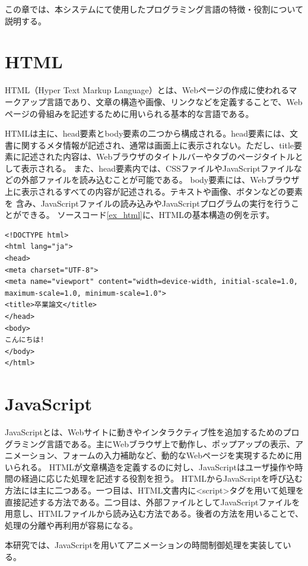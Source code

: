 この章では、本システムにて使用したプログラミング言語の特徴・役割について説明する。
\section{HTML}
HTML（Hyper Text Markup Language）\cite{htmlHeadBody}とは、Webページの作成に使われるマークアップ言語であり、文章の構造や画像、リンクなどを定義することで、Webページの骨組みを記述するために用いられる基本的な言語である。
\par
HTMLは主に、head要素とbody要素の二つから構成される。head要素には、文書に関するメタ情報が記述され、通常は画面上に表示されない。ただし、title要素に記述された内容は、Webブラウザのタイトルバーやタブのページタイトルとして表示される。
また、head要素内では、CSSファイルやJavaScriptファイルなどの外部ファイルを読み込むことが可能である。
body要素には、Webブラウザ上に表示されるすべての内容が記述される。テキストや画像、ボタンなどの要素を
含み、JavaScriptファイルの読み込みやJavaScriptプログラムの実行を行うことができる。
ソースコード\ref{ex_html}に、HTMLの基本構造の例を示す。
\begin{lstlisting}[caption={HTMLコードの例},label={ex_html},breaklines=true,breakatwhitespace=false]
<!DOCTYPE html>
<html lang="ja">
<head>
<meta charset="UTF-8">
<meta name="viewport" content="width=device-width, initial-scale=1.0, maximum-scale=1.0, minimum-scale=1.0">
<title>卒業論文</title>
</head>
<body>
こんにちは!
</body>
</html>
\end{lstlisting}

\section{JavaScript}
JavaScript\cite{htmlJsBasic}とは、Webサイトに動きやインタラクティブ性を追加するためのプログラミング言語である。主にWebブラウザ上で動作し、ポップアップの表示、アニメーション、フォームの入力補助など、動的なWebページを実現するために用いられる。
HTMLが文章構造を定義するのに対し、JavaScriptはユーザ操作や時間の経過に応じた処理を記述する役割を担う。
HTMLからJavaScriptを呼び込む方法には主に二つある。一つ目は、HTML文書内に<script>タグを用いて処理を直接記述する方法である。二つ目は、外部ファイルとしてJavaScriptファイルを用意し、HTMLファイルから読み込む方法である。後者の方法を用いることで、処理の分離や再利用が容易になる。
\par
本研究では、JavaScriptを用いてアニメーションの時間制御処理を実装している。